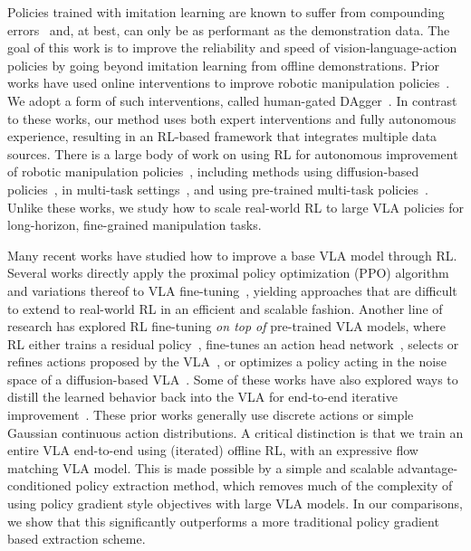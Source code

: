 \documentclass[conference]{IEEEtran}
\begin{document}
Policies trained with imitation learning are known to suffer from compounding errors~\cite{ross2011dagger} and, at best, can only be as performant as the demonstration data. The goal of this work is to improve the reliability and speed of vision-language-action policies by going beyond imitation learning from offline demonstrations.
Prior works have used online interventions to improve robotic manipulation policies~\cite{Laskey2016SHIV,Laskey2017DART,jang2022bc,Hu2025RaC}. We adopt a form of such interventions, called human-gated DAgger~\cite{kelly2019hg,jang2022bc}.
In contrast to these works, our method uses both expert interventions and fully autonomous experience, resulting in an RL-based framework that integrates multiple data sources. There is a large body of work on using RL for autonomous improvement of robotic manipulation policies~\cite{levine2016end,kalashnikov2018qt,mandlekar2019iris,Sharma2023MEDALpp,Mendonca2023ALAN,Mendonca2024ContinuouslyImprovingMobileManipulation,luo2024serl,ankile2025residual,LampeMastering2024}, including methods using diffusion-based policies~\cite{Dong2025BatchOnlineIDQL,Ren2025DPPO,Lei2025RL100}, in multi-task settings~\cite{mtopt2021arxiv,Gupta2021ResetFreeMultiTask}, and using pre-trained multi-task policies~\cite{bousmalis2023robocat,Kumar2023PreTrainingForRobots,Yang2024RoboFuME}. Unlike these works, we study how to scale real-world RL to large VLA policies for long-horizon, fine-grained manipulation tasks.

Many recent works have studied how to improve a base VLA model through RL. Several works directly apply the proximal policy optimization (PPO) algorithm and variations thereof %
to VLA fine-tuning~\cite{Tan2025InteractivePostTraining,Lu2025VLARL,Liu2025WhatCanRLBringVLA,Chen2025piRL,Li2025SimpleVLA_RL}, yielding approaches that are difficult to extend to real-world RL in an efficient and scalable fashion. 
Another line of research has explored RL fine-tuning \emph{on top of} pre-trained VLA models, where RL either trains a residual policy~\citep{Guo2025ImprovingVLA,xiao2025selfimprovingvisionlanguageactionmodelsdata}, fine-tunes an action head network~\cite{chen2025conrft}, selects or refines actions proposed by the VLA~\cite{Mark2024PolicyAgnosticRL,nakamoto2025steering,zhang2025ate}, or optimizes a policy acting in the noise space of a diffusion-based VLA~\cite{Wagenmaker2025DSRL}. Some of these works have also explored ways to distill the learned behavior back into the VLA for end-to-end iterative improvement~\citep{Mark2024PolicyAgnosticRL,Guo2025ImprovingVLA,xiao2025selfimprovingvisionlanguageactionmodelsdata,xu2024rldg}. These prior works generally use discrete actions or simple Gaussian continuous action distributions. 
A critical distinction is that we train an entire VLA end-to-end using (iterated) offline RL, with an expressive flow matching VLA model. 
This is made possible by a simple and scalable advantage-conditioned policy extraction method, which removes much of the complexity of using policy gradient style objectives with large VLA models. In our comparisons, we show that this significantly outperforms a more traditional policy gradient based extraction scheme.
\end{document}
